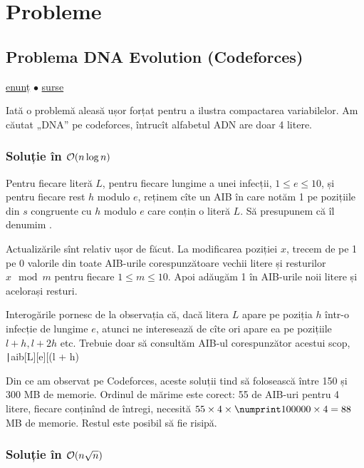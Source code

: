 \documentclass[../main.tex]{subfiles}
\begin{document}
\section{Probleme}

\subsection{Problema DNA Evolution (Codeforces)}
\label{problem:dna-evolution}

\href{https://codeforces.com/contest/827/problem/C}{enunț}
$\bullet$
\hyperref[code:dna-evolution]{surse}

Iată o problemă aleasă ușor forțat pentru a ilustra compactarea variabilelor. Am căutat „DNA” pe codeforces, întrucît alfabetul ADN are doar 4 litere. 

\subsubsection*{Soluție în \texorpdfstring{$\mathcal{O}(n \log n)$}{O(n log n)}}

Pentru fiecare literă $L$, pentru fiecare lungime a unei infecții, $1 \leq e \leq 10$, și pentru fiecare rest $h$ modulo $e$, reținem cîte un AIB în care notăm 1 pe pozițiile din $s$ congruente cu $h$ modulo $e$ care conțin o literă $L$. Să presupunem că îl denumim .

Actualizările sînt relativ ușor de făcut. La modificarea poziției $x$, trecem de pe 1 pe 0 valorile din toate AIB-urile corespunzătoare vechii litere și resturilor $x \mod m$ pentru fiecare $1 \leq m \leq 10$. Apoi adăugăm 1 în AIB-urile noii litere și acelorași resturi.

Interogările pornesc de la observația că, dacă litera $L$ apare pe poziția $h$ într-o infecție de lungime $e$, atunci ne interesează de cîte ori apare ea pe pozițiile $l + h, l + 2h$ etc. Trebuie doar să consultăm AIB-ul corespunzător acestui scop, \texttt|aib[L][e][(l + h) %

Din ce am observat pe Codeforces, aceste soluții tind să folosească între 150 și 300 MB de memorie. Ordinul de mărime este corect: 55 de AIB-uri pentru 4 litere, fiecare conținînd  de întregi, necesită $55 \times 4 \times \np{100000} \times 4 = 88$ MB de memorie. Restul este posibil să fie risipă.

\subsubsection*{Soluție în \texorpdfstring{$\mathcal{O}(n \sqrt{n})$}{O(n sqrt n)}}
\end{document}
